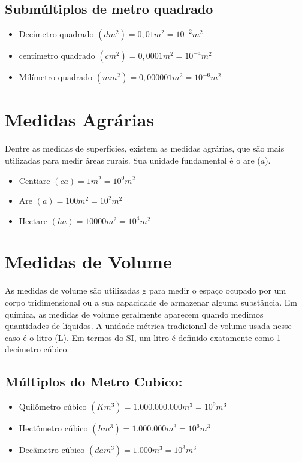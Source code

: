 	\subsection{Submúltiplos de metro quadrado}
		\begin{itemize}
			\item Decímetro quadrado $(dm^2) = 0,01m^2 = 10^{-2}m^2$
			\item centímetro quadrado $(cm^2) = 0,0001m^2 = 10^{-4}m^2$
			\item Milímetro quadrado $(mm^2)= 0,000001m^2 = 10^{-6}m^2$
		\end{itemize}
	
\section{Medidas Agrárias}
Dentre as medidas de superfícies, existem as medidas
agrárias, que são mais utilizadas para medir áreas rurais. Sua
unidade fundamental é o are ($a$).
	\begin{itemize}
		\item Centiare $(ca) = 1m^2=10^0m^2$
		\item Are $(a)= 100m^2 = 10^2m^2$
		\item Hectare $(ha) = 10000m^2 = 10^4m^2$
	\end{itemize}

\section{Medidas de Volume} 
As medidas de volume são utilizadas g
para medir o espaço ocupado por um
corpo tridimensional ou a sua
capacidade de armazenar alguma
substância. Em química, as medidas de
volume geralmente aparecem quando
medimos quantidades de líquidos. A
unidade métrica tradicional de volume
usada nesse caso é o litro (L). Em termos
do SI, um litro é definido exatamente
como 1 decímetro cúbico. 
	\subsection{Múltiplos do Metro Cubico:}
		\begin{itemize}
		    \item Quilômetro cúbico $(Km^3) = 1.000.000.000 m^3 = 10^9 m^3$
		    \item Hectômetro cúbico $(hm^3) = 1.000.000 m^3 = 10^6 m^3$
		    \item Decâmetro cúbico $(dam^3) = 1.000 m^3 = 10^3 m^3$
		\end{itemize}
	
